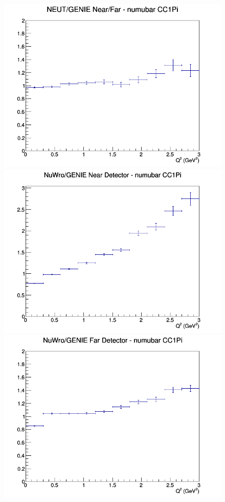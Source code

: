 \documentclass[12pt]{article}
\begin{document}
\begin{figure}[h]
\endminipage
{}
\includegraphics[width=\linewidth]{eff_Q2/LAr/ratios/CC1Pi_NEUT_GENIE_numubar_NF_Q2.png}
\endminipage
\newline
{}
\includegraphics[width=\linewidth]{eff_Q2/LAr/ratios/CC1Pi_NuWro_GENIE_numubar_near_Q2.png}
\endminipage
{}
\includegraphics[width=\linewidth]{eff_Q2/LAr/ratios/CC1Pi_NuWro_GENIE_numubar_far_Q2.png}

\end{figure}
\end{document}
